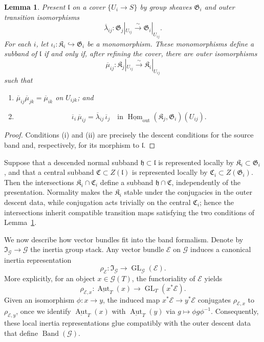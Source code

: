 \documentclass[11pt,reqno]{amsart}
\numberwithin{equation}{section}
\theoremstyle{plain}
\newtheorem{lemm}[prop]{Lemma}
\theoremstyle{definition}
\def\cG{{\mathcal G}}
\def\cE{{\mathcal E}}
\def\fC{{\mathfrak C}}
\def\fG{{\mathfrak G}}
\def\fI{{\mathfrak I}}
\def\fK{{\mathfrak K}}
\def\Hom{{\operatorname{Hom}}}
\def\Aut{{\operatorname{Aut}}}
\def\ra{{\rightarrow}}
\begin{document}
\begin{lemm}
\label{lem:subband-descent}
Present $\mathfrak l$ on a cover $\{U_i\to S\}$ by group sheaves
$\fG_i$ and outer transition isomorphisms
\[
\overline\lambda_{ij}:\fG_j|_{U_{ij}}
\xrightarrow{\sim}\fG_i|_{U_{ij}}.
\]
For each $i$, let $\iota_i:\fK_i\hookrightarrow\fG_i$ be a
monomorphism.  These monomorphisms define a subband of $\mathfrak l$ if
and only if, after refining the cover, there are outer isomorphisms
\[
\overline\mu_{ij}:\fK_j|_{U_{ij}}
\xrightarrow{\sim}\fK_i|_{U_{ij}}
\]
such that
\begin{enumerate}[label=\textup{(\roman*)}]
\item
$\overline\mu_{ij}\overline\mu_{jk}=\overline\mu_{ik}$ on
$U_{ijk}$; and
\item
\[
\overline\iota_i\,\overline\mu_{ij}
=
\overline\lambda_{ij}\,\overline\iota_j
\quad\text{in }
\underline{\Hom}_{\mathrm{out}}(\fK_j,\fG_i)(U_{ij}).
\]
\end{enumerate}
\end{lemm}

\begin{proof}
Conditions \textup{(i)} and \textup{(ii)} are precisely the descent conditions for the source band and, respectively, for its morphism to $\mathfrak l$.
\end{proof}

Suppose that a descended normal subband
$\mathfrak h\subset\mathfrak l$ is represented locally by
$\fK_i\subset\fG_i$, and that a central subband
$\fC\subset Z(\mathfrak l)$ is represented locally by
$\fC_i\subset Z(\fG_i)$.  Then the intersections
$\fK_i\cap\fC_i$ define a subband $\mathfrak h\cap\fC$, independently of
the presentation.  Normality makes the $\fK_i$ stable under the
conjugacies in the outer descent data, while conjugation acts trivially on
the central $\fC_i$; hence the intersections inherit compatible transition
maps satisfying the two conditions of Lemma~\ref{lem:subband-descent}.

We now describe how vector bundles fit into the band formalism. Denote by
$\fI_{\cG}\to\cG$ the inertia group stack. Any vector bundle $\cE$ on
$\cG$ induces a canonical inertia representation
\[
\rho_{\cE}:\fI_{\cG}\ra\operatorname{GL}_{\cG}(\cE).
\]
More explicitly, for an object $x\in\cG(T)$, the functoriality of $\cE$ yields
\[
\rho_{\cE,x}:\underline{\Aut}_T(x)\ra
\operatorname{GL}_T(x^*\cE).
\]
Given an isomorphism $\phi:x\to y$, the induced map $x^*\cE\to y^*\cE$
conjugates $\rho_{\cE,x}$ to $\rho_{\cE,y}$, once we identify
$\underline{\Aut}_T(x)$ with $\underline{\Aut}_T(y)$ via
$g\mapsto\phi g\phi^{-1}$. Consequently, these local inertia
representations glue compatibly with the outer descent data that define
$\operatorname{Band}(\cG)$.
\end{document}
